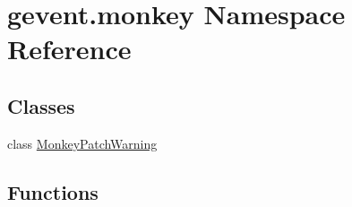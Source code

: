 \hypertarget{namespacegevent_1_1monkey}{}\section{gevent.\+monkey Namespace Reference}
\label{namespacegevent_1_1monkey}
\subsection*{Classes}
\begin{DoxyCompactItemize}
\item 
class \hyperlink{classgevent_1_1monkey_1_1_monkey_patch_warning}{Monkey\+Patch\+Warning}
\end{DoxyCompactItemize}
\subsection*{Functions}

